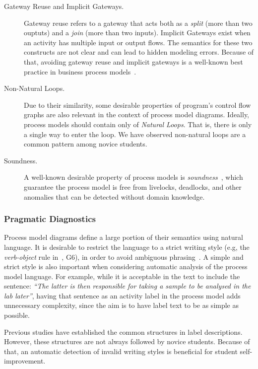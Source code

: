 \begin{description}
\item[Gateway Reuse and Implicit Gateways.]{Gateway reuse re\-fers to a gateway
    that acts both as a \emph{split} (more than two ouptuts) and a \emph{join}
    (more than two inputs). Implicit Gateways exist when an activity has
    multiple input or output flows. The semantics for these two constructs are not
    clear and can lead to hidden modeling errors. Because of that, avoiding gateway reuse and implicit
    gateways is a well-known best practice in business process models~\cite{MendlingRA10,BernsteinS15,Haisjackl2018}.}
\item[Non-Natural Loops.]{Due to their similarity, some desirable properties of
    program's control flow graphs are also relevant in the context of process
    model diagrams. Ideally, process models should contain only of \emph{Natural
      Loops}. That is, there is only a single way to enter the loop. 
      We have observed non-natural loops are a common pattern among novice students.}
\item[Soundness.]{A well-known desirable property of process models is {\em soundness}~\cite{AalstHHSVVW11}, which guarantee the process model is free from livelocks, deadlocks, and other anomalies that can be detected without domain knowledge.}
\end{description}

\subsubsection{Pragmatic Diagnostics}

Process model diagrams define a large portion of their semantics using natural
language. It is desirable to restrict the language to a strict writing style (e.g, the {\em verb-object} rule in~\cite{MendlingRA10}, G6), in
order to avoid ambiguous phrasing~\cite{Leopold0M12}. A simple and strict style is also important
when considering automatic analysis of the process model language. For example, 
while it is acceptable in the text to include the sentence: \emph{``The latter is then
responsible for taking a sample to be analysed in the lab later''}, having that 
sentence as an activity label in the process model adds unnecessary complexity,
since the aim is to have label text to be as simple as possible.

Previous studies \cite{mendling2010activity, Leopold0M12, leopold2013detection,PittkeLM16} have
established the common structures in label descriptions. However, these
structures are not always followed by novice students. Because of that, an
automatic detection of invalid writing styles is beneficial for student
self-improvement.

